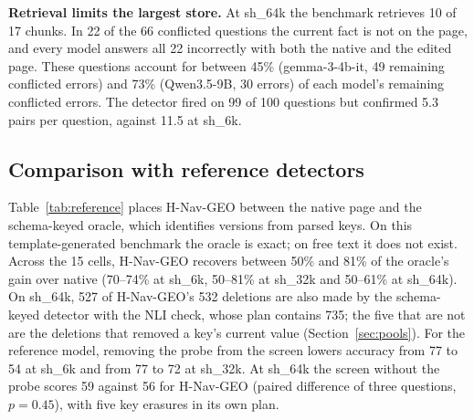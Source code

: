 \documentclass[11pt]{article}
\newcommand{\sub}[1]{\textsf{sh\_#1}}                    %
\newcommand{\geo}{H-Nav-GEO}
\begin{document}
\textbf{Retrieval limits the largest store.} At \sub{64k} the benchmark retrieves 10 of 17 chunks. In 22 of the 66 conflicted questions the current fact is not on the page, and every model answers all 22 incorrectly with both the native and the edited page. These questions account for between 45\% (gemma-3-4b-it, 49 remaining conflicted errors) and 73\% (Qwen3.5-9B, 30 errors) of each model's remaining conflicted errors. The detector fired on 99 of 100 questions but confirmed 5.3 pairs per question, against 11.5 at \sub{6k}.

\subsection{Comparison with reference detectors}
\label{sec:reference}

Table~\ref{tab:reference} places \geo{} between the native page and the schema-keyed oracle, which identifies versions from parsed keys. On this template-generated benchmark the oracle is exact; on free text it does not exist. Across the 15 cells, \geo{} recovers between 50\% and 81\% of the oracle's gain over native (70--74\% at \sub{6k}, 50--81\% at \sub{32k} and 50--61\% at \sub{64k}). On \sub{64k}, 527 of \geo{}'s 532 deletions are also made by the schema-keyed detector with the NLI check, whose plan contains 735; the five that are not are the deletions that removed a key's current value (Section~\ref{sec:pools}). For the reference model, removing the probe from the screen lowers accuracy from 77 to 54 at \sub{6k} and from 77 to 72 at \sub{32k}. At \sub{64k} the screen without the probe scores 59 against 56 for \geo{} (paired difference of three questions, $p=0.45$), with five key erasures in its own plan.
\end{document}

